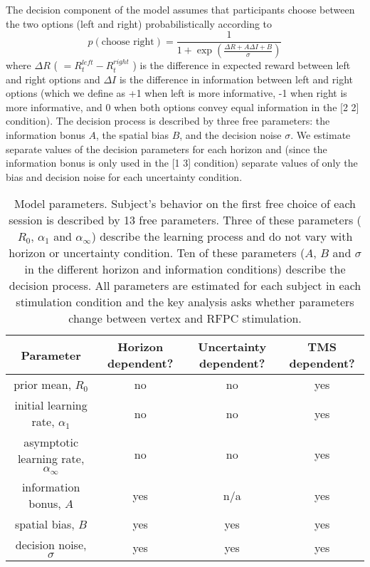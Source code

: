 \documentclass[12pt]{article}
\begin{document}
The decision component of the model assumes that participants choose between the two options (left and right) probabilistically according to 
\begin{equation}
	p(\mbox{choose right}) = \frac{1}{ 1 + \exp \left( \frac{\Delta R + A \Delta I + B}{\sigma}\right) }
\end{equation}
where $\Delta R$ ( $= R^{left}_t - R^{right}_t$ ) is the difference in expected reward between left and right options and $\Delta I$ is the difference in information between left and right options (which we define as +1 when left is more informative, -1 when right is more informative, and 0 when both options convey equal information in the [2 2] condition). The decision process is described by three free parameters: the information bonus $A$, the spatial bias $B$, and the decision noise $\sigma$.  We estimate separate values of the decision parameters for each horizon and (since the information bonus is only used in the [1 3] condition) separate values of only the bias and decision noise for each uncertainty condition. 




\begin{table}[t]
\small
\begin{center}
\begin{tabular}{|c|c|c|c|}
\hline
Parameter &
Horizon dependent? &
Uncertainty dependent? &
TMS dependent? \\
\hline
prior mean, $R_0$ &
no &
no &
yes \\
\hline
initial learning rate, $\alpha_1$ &
no &
no &
yes \\
\hline
asymptotic learning rate, $\alpha_{\infty}$ &
no &
no &
yes \\
\hline
information bonus, $A$ &
yes &
n/a &
yes \\
\hline
spatial bias, $B$ &
yes &
yes &
yes \\
\hline
decision noise, $\sigma$ &
yes & 
yes &
yes \\
\hline
\end{tabular}
\end{center}
\caption{Model parameters. Subject's behavior on the first free choice of each session is described by 13 free parameters.  Three of these parameters ($R_0$, $\alpha_1$ and $\alpha_{\infty}$) describe the learning process and do not vary with horizon or uncertainty condition. Ten of these parameters ($A$, $B$ and $\sigma$ in the different horizon and information conditions) describe the decision process.  All parameters are estimated for each subject in each stimulation condition and the key analysis asks whether parameters change between vertex and RFPC stimulation.}
\label{table1}
\end{table}%
\end{document}
